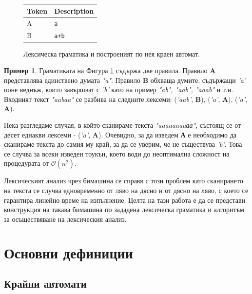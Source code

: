 \documentclass[12pt, oneside]{article}
\theoremstyle{definition}
\newtheorem{example}{Пример}[section]
\begin{document}
\begin{figure}[!htb]
	\begin{center}
		\begin{tabular}{ |l|l| } 
		\hline
		Token & Description \\
		\hline
		A & \verb/а/ \\
		B & \verb/a+b/ \\
		\hline
		\end{tabular}
	\end{center}
	\centering
	\begingroup
		
	\endgroup
	\label{fig:Lexgr2}
	\caption{Лексическа граматика и построеният по нея краен автомат.}
\end{figure}

\begin{example}
	Граматиката на Фигура \ref{fig:Lexgr2} съдържа две правила. Правило \textbf{A} представлява единствено думата \emph{"a"}. Правило \textbf{B} обхваща думите, съдържащи \emph{'a'} поне веднъж, които завършват с \emph{'b'} като на пример \emph{"ab", "aab", "aaab"} и т.н. Входният текст \emph{"aabaa"} се разбива на следните лексеми: (\emph{'aab'}, \textbf{B}), (\emph{'a'}, \textbf{A}), (\emph{'a'}, \textbf{A}).

	Нека разгледаме случая, в който сканираме текста \emph{"aaaaaaaaаа"}, състоящ се от десет еднакви лексеми - (\emph{'a'}, \textbf{A}). Очевидно, за да изведем \textbf{А} е необходимо да сканираме текста до самия му край, за да се уверим, че не съществува \emph{'b'}. Това се случва за всеки изведен тоукън, което води до неоптимална сложност на процедурата от \( \mathcal{O}(n^2) \).
\end{example}

Лексическият анализ чрез бимашина се справя с този проблем като сканирането на текста се случва едновременно от ляво на дясно и от дясно на ляво, с което се гарантира линейно време на изпълнение. Целта на тази работа е да се представи конструкция на такава бимашина по зададена лексическа граматика и алгоритъм за осъществяване на лексическия анализ.

\pagebreak
\section{Основни дефиниции}

\subsection{Крайни автомати}
\end{document}
